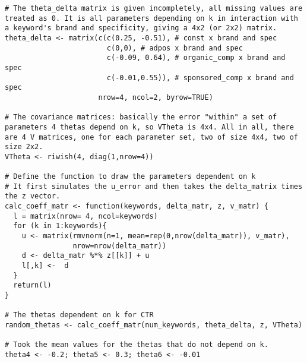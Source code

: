 \begin{lstlisting}[caption={Code for simulating $\Delta^{\theta}$ and $V^{\theta}$.}]
# The theta_delta matrix is given incompletely, all missing values are treated as 0. It is all parameters depending on k in interaction with a keyword's brand and specificity, giving a 4x2 (or 2x2) matrix.
theta_delta <- matrix(c(c(0.25, -0.51), # const x brand and spec
                        c(0,0), # adpos x brand and spec
                        c(-0.09, 0.64), # organic_comp x brand and spec
                        c(-0.01,0.55)), # sponsored_comp x brand and spec
                      nrow=4, ncol=2, byrow=TRUE)
                      
# The covariance matrices: basically the error "within" a set of parameters 4 thetas depend on k, so VTheta is 4x4. All in all, there are 4 V matrices, one for each parameter set, two of size 4x4, two of size 2x2.
VTheta <- riwish(4, diag(1,nrow=4))

# Define the function to draw the parameters dependent on k
# It first simulates the u_error and then takes the delta_matrix times the z vector.
calc_coeff_matr <- function(keywords, delta_matr, z, v_matr) {
  l = matrix(nrow= 4, ncol=keywords)
  for (k in 1:keywords){
    u <- matrix(rmvnorm(n=1, mean=rep(0,nrow(delta_matr)), v_matr),
                nrow=nrow(delta_matr))
    d <- delta_matr %*% z[[k]] + u
    l[,k] <-  d
  }
  return(l)
}

# The thetas dependent on k for CTR
random_thetas <- calc_coeff_matr(num_keywords, theta_delta, z, VTheta)

# Took the mean values for the thetas that do not depend on k.
theta4 <- -0.2; theta5 <- 0.3; theta6 <- -0.01
\end{lstlisting}